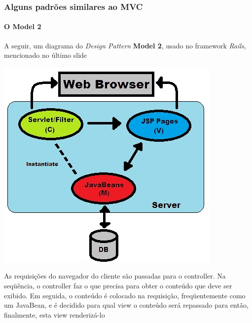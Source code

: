 \documentclass{beamer}
\begin{document}
\begin{frame}
\frametitle{Alguns padrões similares ao MVC}
\framesubtitle{O Model 2}
	A seguir, um diagrama do \textit{Design Pattern} \textbf{Model 2}, usado no framework \textit{Rails}, mencionado no último slide
	\begin{center}
		\includegraphics[scale=0.2]{Model2.jpg}
	\end{center}
	As requisições do navegador do cliente são passadas para o controller. Na seqüência, o controller faz o que precisa para obter o conteúdo que deve ser exibido.
	Em seguida, o conteúdo é colocado na requisição, freqüentemente como um JavaBean, e é decidido para qual view o conteúdo será repassado para então, finalmente, esta
	view renderizá-lo
\end{frame}
\end{document}
